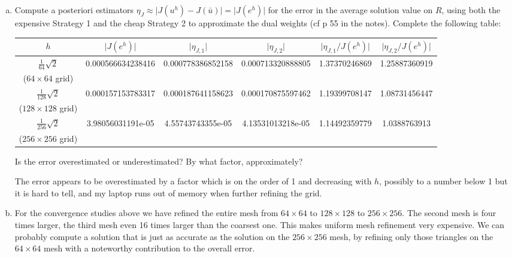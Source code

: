 \begin{enumerate}[(a)]
\item Compute a posteriori estimators $\eta_{J}\approx \lvert J(u^h) - J(\bar{u}) \rvert = \lvert J(e^h) \rvert$ for the error in the average solution value on $R$, using both the expensive Strategy 1 and the cheap Strategy 2 to approximate the dual weights (cf p 55 in the notes). Complete the following table:

\begin{center}
\begin{tabular}{cccccc}
\toprule
$h$ & $\lvert J(e^h) \rvert$ & $\lvert \eta_{J,1} \rvert$ & $\lvert \eta_{J,2} \rvert$ & $\lvert \eta_{J,1} / J(e^h) \rvert$ & $\lvert \eta_{J,2} / J(e^h) \rvert$\\
\toprule
$\frac{1}{64}\sqrt{2}$  & 0.000566634238416 & 0.000778386852158 & 0.000713320888805 & 1.37370246869 & 1.25887360919\\
($64\times 64$ grid)\\
\midrule
$\frac{1}{128}\sqrt{2}$ & 0.000157153783317 & 0.000187641158623 & 0.000170875597462 & 1.19399708147 & 1.08731456447\\
($128\times 128$ grid)\\
\midrule
$\frac{1}{256}\sqrt{2}$ & 3.98056031191e-05 & 4.55743743355e-05 & 4.13531013218e-05 & 1.14492359779 & 1.0388763913\\
($256\times 256$ grid)\\
\bottomrule
\end{tabular}
\end{center}
Is the error overestimated or underestimated? By what factor, approximately?

\begin{solution}

The error appears to be overestimated by a factor which is on the order of 1 and decreasing with $h$, possibly to a number below 1 but it is hard to tell, and my laptop runs out of memory when further refining the grid.

\end{solution}

\vfill

\item%
For the convergence studies above we have refined the entire mesh from $64 \times 64$ to $128 \times 128$ to $256 \times 256$. The second mesh is four times larger, the third mesh even 16 times larger than the coarsest one. This makes uniform mesh refinement very expensive. We can probably compute a solution that is just as accurate as the solution on the $256 \times 256$ mesh, by refining only those triangles on the $64 \times 64$ mesh with a noteworthy contribution to the overall error.


\end{enumerate}
